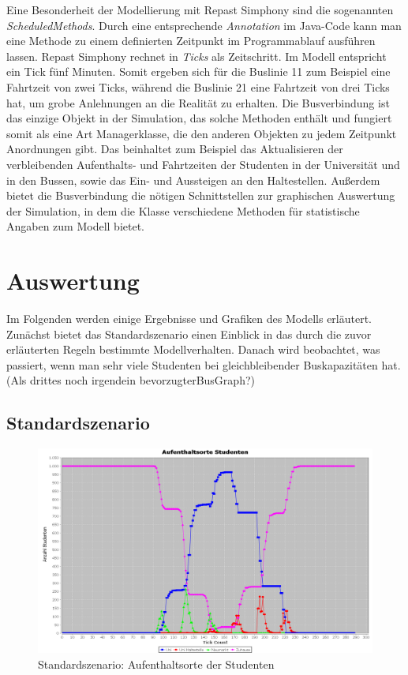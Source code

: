 \documentclass[12pt,a4paper]{scrartcl}
\begin{document}
Eine Besonderheit der Modellierung mit Repast Simphony sind die sogenannten \textit{ScheduledMethods}. Durch eine entsprechende \textit{Annotation} im Java-Code kann man eine Methode zu einem definierten Zeitpunkt im Programmablauf ausführen lassen. Repast Simphony rechnet in \textit{Ticks} als Zeitschritt. Im Modell entspricht ein Tick fünf Minuten. Somit ergeben sich für die Buslinie 11 zum Beispiel eine Fahrtzeit von zwei Ticks, während die Buslinie 21 eine Fahrtzeit von drei Ticks hat, um grobe Anlehnungen an die Realität zu erhalten. Die Busverbindung ist das einzige Objekt in der Simulation, das solche Methoden enthält und fungiert somit als eine Art Managerklasse, die den anderen Objekten zu jedem Zeitpunkt Anordnungen gibt. Das beinhaltet zum Beispiel das Aktualisieren der verbleibenden Aufenthalts- und Fahrtzeiten der Studenten in der Universität und in den Bussen, sowie das Ein- und Aussteigen an den Haltestellen. Außerdem bietet die Busverbindung die nötigen Schnittstellen zur graphischen Auswertung der Simulation, in dem die Klasse verschiedene Methoden für statistische Angaben zum Modell bietet. 

\section{Auswertung}\label{erg}
Im Folgenden werden einige Ergebnisse und Grafiken des Modells erläutert. Zunächst bietet das Standardszenario einen Einblick in das durch die zuvor erläuterten Regeln bestimmte Modellverhalten. Danach wird beobachtet, was passiert, wenn man sehr viele Studenten bei gleichbleibender Buskapazitäten hat. (Als drittes noch irgendein bevorzugterBusGraph?)

\newpage 


\subsection{Standardszenario}\label{s1}
\begin{figure}
\includegraphics[scale=0.4]{Standardszenario_Aufenthaltsorte.png}
\caption{Standardszenario: Aufenthaltsorte der Studenten}
\label{s1g1}
\end{figure}
\end{document}
